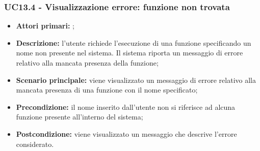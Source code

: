 \subsubsection{UC13.4 - Visualizzazione errore: funzione non trovata}
\begin{itemize}
	\item \textbf{Attori primari:} \ua{};
	\item \textbf{Descrizione:}  l’utente richiede l’esecuzione di una funzione specificando un nome non presente nel sistema. Il sistema riporta un messaggio di errore relativo alla mancata presenza della funzione;
	\item \textbf{Scenario principale:} viene visualizzato un messaggio di errore relativo alla mancata presenza di una funzione con il nome specificato; 
	\item \textbf{Precondizione:} il nome inserito dall’utente non si riferisce ad alcuna funzione presente all’interno del sistema;  
	\item \textbf{Postcondizione:} viene visualizzato un messaggio che descrive l’errore considerato. 
\end{itemize}